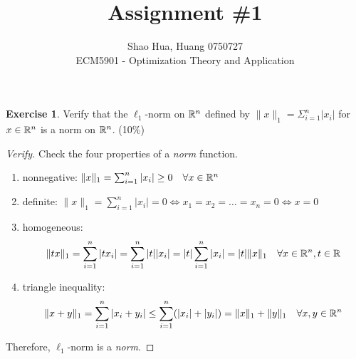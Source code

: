 \documentclass[12pt]{extarticle}
\title{Assignment \#1}
\author{Shao Hua, Huang 0750727\\
ECM5901 - Optimization Theory and Application}
\theoremstyle{definition}
\newtheorem{exercise}{Exercise}
\begin{document}
\maketitle

\begin{exercise}
  Verify that the $\ell_1$-norm on $\mathbb{R}^n$ defined by $\|x\|_1=\Sigma_{i=1}^n|x_i|$ for $x\in\mathbb{R}^n$ is a norm on $\mathbb{R}^n$. (10\%)
\end{exercise}
\begin{proof}[Verify]
  Check the four properties of a \textit{norm} function.
  \begin{enumerate}[label=(\arabic*)]
    \item nonnegative: $\|x\|_1=\sum_{i=1}^n|x_i|\ge 0\quad\forall x\in\mathbb{R}^n$
    \item definite: $\|x\|_1=\sum_{i=1}^n|x_i|=0\Leftrightarrow x_1=x_2=\dots=x_n=0\Leftrightarrow x=0$
    \item homogeneous: $$\|tx\|_1=\sum_{i=1}^n|tx_i|=\sum_{i=1}^n|t||x_i|=|t|\sum_{i=1}^n|x_i|=|t|\|x\|_1\quad \forall x\in \mathbb{R}^n, t\in\mathbb{R}$$
    \item triangle inequality: $$\|x+y\|_1=\sum_{i=1}^n|x_i+y_i|\le\sum_{i=1}^n(|x_i|+|y_i|)=\|x\|_1+\|y\|_1\quad \forall x,y\in \mathbb{R}^n$$
  \end{enumerate}
  Therefore, $\ell_1$-norm is a \textit{norm}.
\end{proof}
\end{document}
